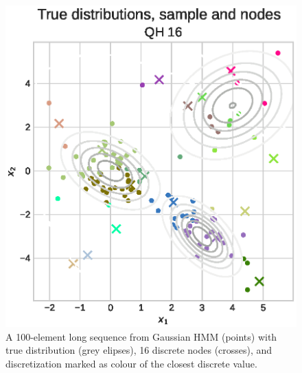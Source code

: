 \documentclass[shortabstract]{iithesis}
\begin{document}
\begin{figure}[!ht]
    \includegraphics[scale=0.42]{gaussianHmm_discrete_example_halton.eps}
    \caption{A 100-element long sequence from Gaussian HMM (points) with true distribution (grey elipses), 16 discrete nodes (crosses), and discretization marked as colour of the closest discrete value.}
    \label{fig:gaussian-hmm-nodes}
\end{figure}

\newpage




\end{document}
